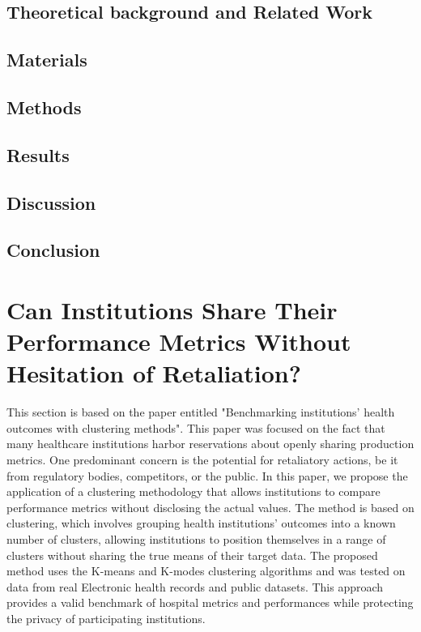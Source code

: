\subsection{Theoretical background and Related Work}

\subsection{Materials}

\subsection{Methods}

\subsection{Results}

\subsection{Discussion}

\subsection{Conclusion}



\section{Can Institutions Share Their Performance Metrics Without Hesitation of Retaliation?}\label{subsec:benchmark}
This section is based on the paper entitled "Benchmarking institutions' health outcomes with clustering methods". This paper was focused on the fact that many healthcare institutions harbor reservations about openly sharing production metrics. One predominant concern is the potential for retaliatory actions, be it from regulatory bodies, competitors, or the public. In this paper, we propose the application of a clustering methodology that allows institutions to compare performance metrics without disclosing the actual values. The method is based on clustering, which involves grouping health institutions' outcomes into a known number of clusters, allowing institutions to position themselves in a range of clusters without sharing the true means of their target data. The proposed method uses the K-means and K-modes clustering algorithms and was tested on data from real Electronic health records and public datasets. This approach provides a valid benchmark of hospital metrics and performances while protecting the privacy of participating institutions. 
